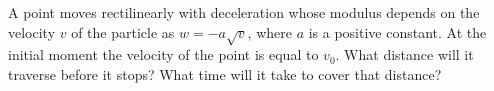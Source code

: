 
\item A point moves rectilinearly with deceleration whose modulus depends on the velocity \( v \) of the particle as \( w = -a\sqrt{v} \), where \( a \) is a positive constant. At the initial moment the velocity of the point is equal to \( v_0 \). What distance will it traverse before it stops? What time will it take to cover that distance?
    
